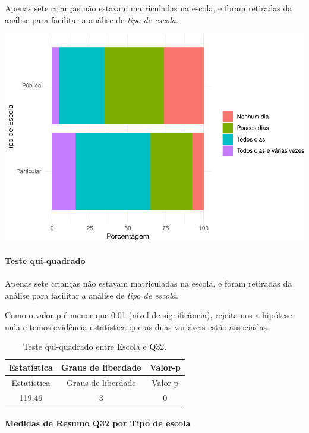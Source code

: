 \documentclass[]{article}
\let\oldparagraph\paragraph
\renewcommand{\paragraph}[1]{\oldparagraph{#1}\mbox{}}
\begin{document}
Apenas sete crianças não estavam matriculadas na escola, e foram retiradas da análise para facilitar a análise de \emph{tipo de escola}.

\begin{center}\includegraphics[width=0.75\linewidth]{relatorio_covid19_files/figure-latex/unnamed-chunk-1116-1} \end{center}

\hypertarget{teste-qui-quadrado-96}{%
\paragraph{Teste qui-quadrado}\label{teste-qui-quadrado-96}}

Apenas sete crianças não estavam matriculadas na escola, e foram retiradas da análise para facilitar a análise de \emph{tipo de escola}.

Como o valor-p é menor que 0.01 (nível de significância), rejeitamos a hipótese nula e temos evidência estatística que as duas variáveis estão associadas.

\begin{longtable}[]{@{}ccc@{}}
\caption{\label{tab:unnamed-chunk-1118}Teste qui-quadrado entre Escola e Q32.}\tabularnewline
\toprule
Estatística & Graus de liberdade & Valor-p\tabularnewline
\midrule
\endfirsthead
\toprule
Estatística & Graus de liberdade & Valor-p\tabularnewline
\midrule
\endhead
119,46 & 3 & 0\tabularnewline
\bottomrule
\end{longtable}

\cleardoublepage

\hypertarget{medidas-de-resumo-q32-por-tipo-de-escola}{%
\paragraph{Medidas de Resumo Q32 por Tipo de escola}\label{medidas-de-resumo-q32-por-tipo-de-escola}}
\end{document}
